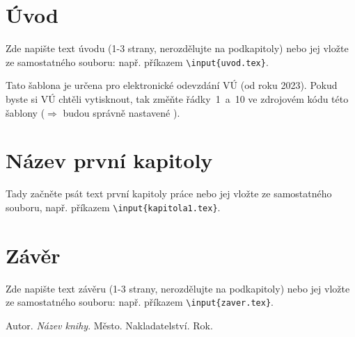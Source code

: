 \documentclass[a4paper,oneside,12pt]{book} %
\newcommand{\ti}{\textit} %
\begin{document}
\parskip=0pt
\tableofcontents %
\parskip=7pt



\chapter*{Úvod} %
%
Zde napište text úvodu (1-3 strany, nerozdělujte na podkapitoly) nebo jej vložte ze samostatného souboru: např. příkazem \texttt{\textbackslash input\{uvod.tex\}}.

Tato šablona je určena {\color{red}pro elektronické odevzdání VÚ} (od roku 2023). Pokud byste si VÚ chtěli vytisknout, tak změňte řádky~1~a~10 ve zdrojovém kódu této šablony ($\Rightarrow$ budou správně nastavené ).
%
%



\chapter{Název první kapitoly}
%
Tady začněte psát text první kapitoly práce nebo jej vložte ze samostatného souboru, např. příkazem \texttt{\textbackslash input\{kapitola1.tex\}}.
%


\chapter*{Závěr}
%
Zde napište text závěru (1-3 strany, nerozdělujte na podkapitoly) nebo jej vložte ze samostatného souboru: např. příkazem \texttt{\textbackslash input\{zaver.tex\}}.
%
%


\begin{thebibliography}{99}   
	 Autor. \ti{Název knihy}. Město. Nakladatelství. Rok.  
\end{thebibliography}
\end{document}
